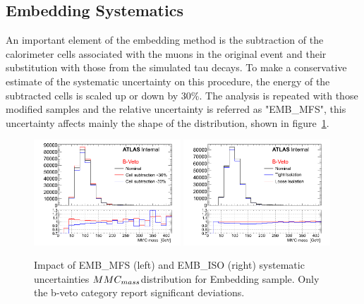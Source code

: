 
\subsection{\Ztautau Embedding Systematics}\label{sec:embsys}

An important element of the embedding method is the subtraction of the 
calorimeter cells associated with the muons in the original \Zmumu event and their substitution with those from the simulated tau
decays. To make a conservative estimate of the systematic uncertainty on this procedure, 
the energy of the subtracted cells is scaled up or down by 30\%. The analysis is repeated with those modified 
samples and the relative uncertainty is referred as "EMB\_MFS", this uncertainty affects mainly the shape of the \mmc 
distribution, shown in figure~\ref{fig:EMBMFS}.

\begin{figure}[tp]
	\begin{center}
	\includegraphics[width=0.49\textwidth]{figure/systematics/emb_sys_NoBtagFull_MFS.png}
	\includegraphics[width=0.49\textwidth]{figure/systematics/emb_sys_NoBtagFull_Iso.png}
	\end{center}
	\caption{Impact of EMB\_MFS (left) and EMB\_ISO (right) systematic uncertainties $MMC_{mass}$distribution for Embedding sample.
	Only the b-veto category report significant deviations.}
	\label{fig:EMBMFS}
\end{figure}

